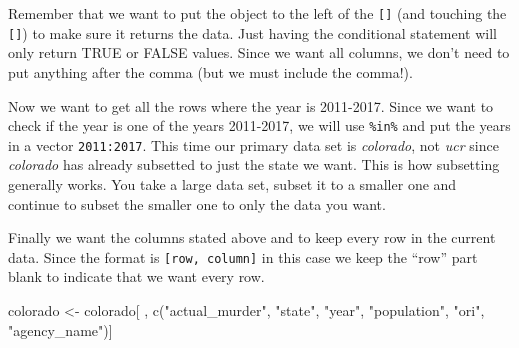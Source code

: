\documentclass[
]{krantz}
\makeatletter
\newenvironment{Shaded}{\begin{snugshade}}{\end{snugshade}}
\newcommand{\DecValTok}[1]{\textcolor[rgb]{0.06,0.06,0.06}{#1}}
\newcommand{\FunctionTok}[1]{\textcolor[rgb]{0,0,0}{#1}}
\newcommand{\NormalTok}[1]{#1}
\newcommand{\OtherTok}[1]{\textcolor[rgb]{0.37,0.37,0.37}{#1}}
\newcommand{\SpecialCharTok}[1]{\textcolor[rgb]{0,0,0}{#1}}
\newcommand{\StringTok}[1]{\textcolor[rgb]{0.5,0.5,0.5}{#1}}
\newenvironment{kframe}{%
\medskip{}
\setlength{\fboxsep}{.8em}
 \def\at@end@of@kframe{}%
 \ifinner\ifhmode%
  \def\at@end@of@kframe{\end{minipage}}%
  \begin{minipage}{\columnwidth}%
 \fi\fi%
 \def\FrameCommand##1{\hskip\@totalleftmargin \hskip-\fboxsep
 \colorbox{shadecolor}{##1}\hskip-\fboxsep
     \hskip-\linewidth \hskip-\@totalleftmargin \hskip\columnwidth}%
 \MakeFramed {\advance\hsize-\width
   \@totalleftmargin\z@ \linewidth\hsize
   \@setminipage}}%
 {\par\unskip\endMakeFramed%
 \at@end@of@kframe}
\renewenvironment{Shaded}{\begin{kframe}}{\end{kframe}}
\makeatother
\begin{document}
Remember that we want to put the object to the left of the \texttt{{[}{]}} (and touching the \texttt{{[}{]}}) to make sure it returns the data. Just having the conditional statement will only return TRUE or FALSE values. Since we want all columns, we don't need to put anything after the comma (but we must include the comma!).

\begin{Shaded}
\end{Shaded}

Now we want to get all the rows where the year is 2011-2017. Since we want to check if the year is one of the years 2011-2017, we will use \texttt{\%in\%} and put the years in a vector \texttt{2011:2017}. This time our primary data set is \emph{colorado}, not \emph{ucr} since \emph{colorado} has already subsetted to just the state we want. This is how subsetting generally works. You take a large data set, subset it to a smaller one and continue to subset the smaller one to only the data you want.

\begin{Shaded}
\end{Shaded}

Finally we want the columns stated above and to keep every row in the current data. Since the format is \texttt{{[}row,\ column{]}} in this case we keep the ``row'' part blank to indicate that we want every row.

\begin{Shaded}
\begin{Highlighting}[]
\NormalTok{colorado }\OtherTok{\textless{}{-}}\NormalTok{ colorado[ , }\FunctionTok{c}\NormalTok{(}\StringTok{"actual\_murder"}\NormalTok{, }\StringTok{"state"}\NormalTok{, }\StringTok{"year"}\NormalTok{,}
                          \StringTok{"population"}\NormalTok{, }\StringTok{"ori"}\NormalTok{, }\StringTok{"agency\_name"}\NormalTok{)]}
\end{Highlighting}
\end{Shaded}
\end{document}
